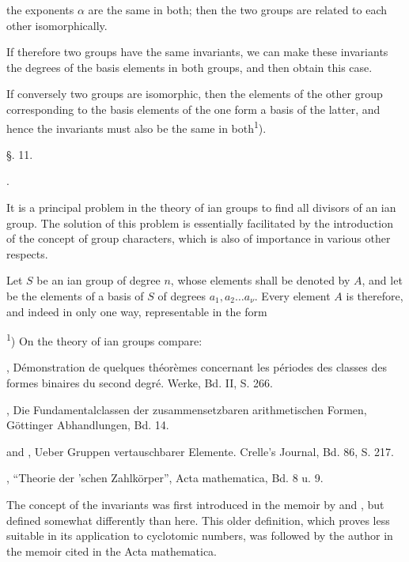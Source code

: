 
the exponents $\alpha$ are the same in both; then the two groups
are related to each other isomorphically.

If therefore two groups have the same invariants, we can
make these invariants the degrees of the basis elements in both
groups, and then obtain this case.

If conversely two groups are isomorphic, then the elements
of the other group corresponding to the basis elements of the
one form a basis of the latter, and hence the invariants
must also be the same in both\textsuperscript{1}).

\begin{center}
§. 11.

.
\end{center}

It is a principal problem in the theory of ian
groups to find all divisors of an ian group. The
solution of this problem is essentially facilitated by the
introduction of the concept of group characters, which is also
of importance in various other respects.

Let $S$ be an ian group of degree $n$, whose elements
shall be denoted by $A$, and let
be the elements of a basis of $S$ of degrees $a_1, a_2 \ldots a_\nu$.
Every element $A$ is therefore, and indeed in only one way,
representable in the form

\textsuperscript{1}) On the theory of ian groups compare:

, D\'emonstration de quelques th\'eor\`emes concernant les
périodes des classes des formes binaires du second degré. Werke,
Bd. II, S. 266.

, Die Fundamentalclassen der zusammensetzbaren
arithmetischen Formen, Göttinger Abhandlungen, Bd. 14.

 and , Ueber Gruppen vertauschbarer
 Elemente. Crelle's Journal, Bd. 86, S. 217.

, ``Theorie der 'schen Zahlkörper'', Acta mathematica,
Bd. 8 u. 9.

The concept of the invariants was first introduced in the memoir
by  and , but defined somewhat differently than
here. This older definition, which proves less suitable in its application to cyclotomic
numbers, was followed by the author in the
memoir cited in the Acta mathematica.
